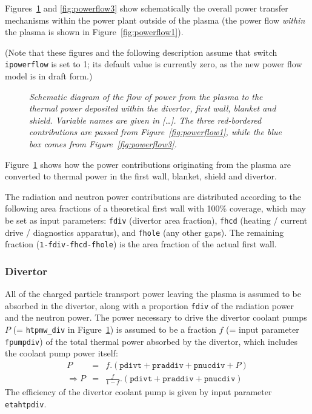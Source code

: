 \documentclass[11pt,a4paper]{report}
\begin{document}
Figures~\ref{fig:powerflow2} and \ref{fig:powerflow3} show schematically the
overall power transfer mechanisms within the power plant outside of the plasma
(the power flow \textit{within}\/ the plasma is shown in
Figure~\ref{fig:powerflow1}).

(Note that these figures and the following description assume that switch
\texttt{ipowerflow} is set to 1; its default value is currently
zero, as the new power flow model is in draft form.)

\begin{figure}[tbph]
\caption[Power flow within the fusion power plant core]
{\label{fig:powerflow2} \textit{Schematic diagram of the flow of power from
    the plasma to the thermal power deposited within the divertor, first wall,
    blanket and shield. Variable names are given in [\ldots]. The three
    red-bordered contributions are passed from Figure~\ref{fig:powerflow1},
    while the blue box comes from Figure~\ref{fig:powerflow3}.} }
\end{figure}

Figure~\ref{fig:powerflow2} shows how the power contributions originating from
the plasma are converted to thermal power in the first wall, blanket, shield
and divertor.

The radiation and neutron power contributions are distributed according to the
following area fractions of a theoretical first wall with 100\% coverage,
which may be set as input parameters: \texttt{fdiv} (divertor area fraction),
\texttt{fhcd} (heating / current drive / diagnostics apparatus), and
\texttt{fhole} (any other gaps). The remaining fraction
(\texttt{1-fdiv-fhcd-fhole}) is the area fraction of the actual first wall.

\subsubsection{Divertor}

All of the charged particle transport power leaving the plasma is assumed to
be absorbed in the divertor, along with a proportion \texttt{fdiv} of the
radiation power and the neutron power. The power necessary to drive the
divertor coolant pumps $P$ (= \texttt{htpmw\_div} in
Figure~\ref{fig:powerflow2}) is assumed to be a fraction $f$ (= input
parameter \texttt{fpumpdiv}) of the total thermal power absorbed by the
divertor, which includes the coolant pump power itself:
\begin{eqnarray*}
P & = & f . (\mathtt{pdivt} + \mathtt{praddiv} + \mathtt{pnucdiv} + P) \\
\Longrightarrow P & = & \frac{f}{1-f} . (\mathtt{pdivt} + \mathtt{praddiv} +
\mathtt{pnucdiv})
\end{eqnarray*}
The efficiency of the divertor coolant pump is given by input parameter
\texttt{etahtpdiv}.
\end{document}
